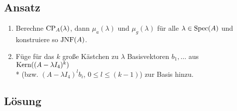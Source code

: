 \subsection{Ansatz}
\begin{enumerate}
	\item Berechne \( \text{CP}_A(\lambda) \), dann \( \mu_a(\lambda) \) und \( \mu_g(\lambda) \) für alle \( \lambda \in \text{Spec}(A) \) und konstruiere so \( \text{JNF}(A) \).
	\item Füge für das \( k \) große Kästchen zu \( \lambda \) Basisvektoren \( b_1,\dots \) aus \( \text{Kern}((A- \lambda I_4)^k) \) \\* (bzw. \( (A-\lambda I_4)^lb_i \), \( 0 \leq l \leq (k-1) \)) zur Basis hinzu.
\end{enumerate}

\subsection{Lösung}
